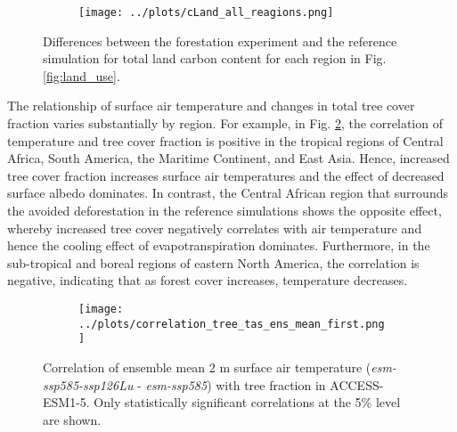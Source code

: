 \documentclass[]{article}
\begin{document}
\begin{figure}[H]
    \centering
    \begin{subfigure}[b]{\linewidth}
        \texttt{[image: ../plots/cLand\_all\_reagions.png]}
    \end{subfigure}

    \caption{Differences between the forestation experiment and the reference simulation for total land carbon content for each region in Fig. \ref{fig:land_use}.}
    \label{fig:accesss_regional_cland}
\end{figure}

The relationship of surface air temperature and changes in total tree cover fraction varies substantially by region.
For example, in Fig. \ref{fig:map_tas_tree_correlation}, the correlation of temperature and tree cover fraction is positive in the tropical regions of Central Africa, South America, the Maritime Continent, and East Asia.
Hence, increased tree cover fraction increases surface air temperatures and the effect of decreased surface albedo dominates.
In contrast, the Central African region that surrounds the avoided deforestation in the reference simulations shows the opposite effect, whereby increased tree cover negatively correlates with air temperature and hence the cooling effect of evapotranspiration dominates.
Furthermore, in the sub-tropical and boreal regions of eastern North America, the correlation is negative, indicating that as forest cover increases, temperature decreases.

\begin{figure}[H]
    \centering
    \begin{subfigure}[b]{0.7\linewidth}
        \texttt{[image: ../plots/correlation\_tree\_tas\_ens\_mean\_first.png]}
    \end{subfigure}
    \caption{Correlation of ensemble mean 2 m surface air temperature (\textit{esm-ssp585-ssp126Lu} - \textit{esm-ssp585}) with tree fraction in ACCESS-ESM1-5. Only statistically significant correlations at the 5\% level are shown.}
    \label{fig:map_tas_tree_correlation}
\end{figure}
\end{document}
